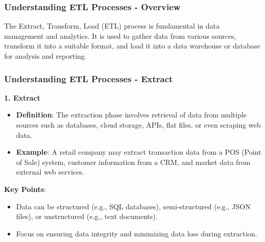 \documentclass[aspectratio=169]{beamer}
\begin{document}
\begin{frame}[fragile]
    \frametitle{Understanding ETL Processes - Overview}

    The Extract, Transform, Load (ETL) process is fundamental in data management and analytics. 
    It is used to gather data from various sources, transform it into a suitable format, and load it into a data warehouse or database for analysis and reporting. 
\end{frame}

\begin{frame}[fragile]
    \frametitle{Understanding ETL Processes - Extract}

    \textbf{1. Extract}

    \begin{itemize}
        \item \textbf{Definition}: The extraction phase involves retrieval of data from multiple sources such as databases, cloud storage, APIs, flat files, or even scraping web data.
        \item \textbf{Example}: A retail company may extract transaction data from a POS (Point of Sale) system, customer information from a CRM, and market data from external web services.
    \end{itemize}

    \textbf{Key Points}:
    \begin{itemize}
        \item Data can be structured (e.g., SQL databases), semi-structured (e.g., JSON files), or unstructured (e.g., text documents).
        \item Focus on ensuring data integrity and minimizing data loss during extraction.
    \end{itemize}
\end{frame}
\end{document}
